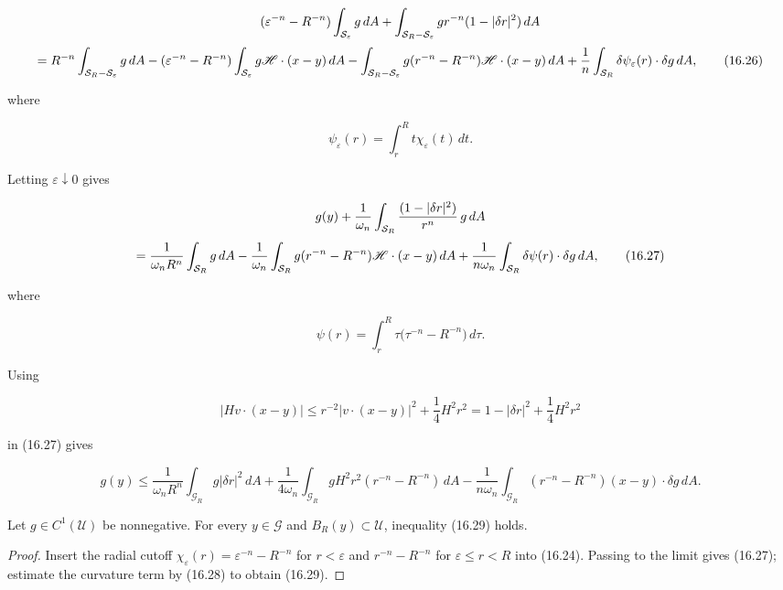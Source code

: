 \[
(\varepsilon^{-n}-R^{-n})\int_{\mathcal{S}_\varepsilon} g\,dA+\int_{\mathcal{S}_R-\mathcal{S}_\varepsilon} gr^{-n}(1-|\delta r|^2)\,dA
\]
\begin{equation}
=R^{-n}\int_{\mathcal{S}_R-\mathcal{S}_\varepsilon} g\,dA-(\varepsilon^{-n}-R^{-n})\int_{\mathcal{S}_\varepsilon} g\mathscr{H}\cdot(x-y)\,dA
\notag\\
-\int_{\mathcal{S}_R-\mathcal{S}_\varepsilon} g(r^{-n}-R^{-n})\mathscr{H}\cdot(x-y)\,dA+\frac{1}{n}\int_{\mathcal{S}_R}\delta\psi_\varepsilon(r)\cdot\delta g\,dA,
\tag{16.26}
\end{equation}

where

\[
\psi_\varepsilon(r)=\int_r^R t\chi_\varepsilon(t)\,dt.
\]

Letting $\varepsilon\downarrow0$ gives

\[
g(y)+\frac{1}{\omega_n}\int_{\mathcal{S}_R}\frac{(1-|\delta r|^2)}{r^n}\,g\,dA
\]
\begin{equation}
=\frac{1}{\omega_n R^n}\int_{\mathcal{S}_R} g\,dA-\frac{1}{\omega_n}\int_{\mathcal{S}_R} g(r^{-n}-R^{-n})\mathscr{H}\cdot(x-y)\,dA
\notag\\
+\frac{1}{n\omega_n}\int_{\mathcal{S}_R}\delta\psi(r)\cdot\delta g\,dA,
\tag{16.27}
\end{equation}

where

\[
\psi(r)=\int_r^R \tau\bigl(\tau^{-n}-R^{-n}\bigr)\,d\tau.
\]

Using

\begin{equation}
|Hv\cdot (x-y)|\le r^{-2}|v\cdot (x-y)|^2+\frac14 H^2r^2
=1-|\delta r|^2+\frac14 H^2r^2
\tag{16.28}
\end{equation}

in (16.27) gives

\begin{equation}
g(y)\le \frac{1}{\omega_n R^n}\int_{\mathcal{G}_R} g|\delta r|^2\,dA
+\frac{1}{4\omega_n}\int_{\mathcal{G}_R} gH^2r^2(r^{-n}-R^{-n})\,dA
-\frac{1}{n\omega_n}\int_{\mathcal{G}_R}(r^{-n}-R^{-n})(x-y)\cdot \delta g\,dA.
\tag{16.29}
\end{equation}

\begin{lemma}\label{gilbarg-trudinger.lem.16.3.potential-estimate}
Let $g\in C^1(\mathcal U)$ be nonnegative. For every $y\in\mathcal G$ and $B_R(y)\subset\mathcal U$, inequality (16.29) holds.
\end{lemma}
\begin{proof}
\sketch Insert the radial cutoff $\chi_\varepsilon(r)=\varepsilon^{-n}-R^{-n}$ for $r<\varepsilon$ and $r^{-n}-R^{-n}$ for $\varepsilon\leq r<R$ into (16.24). Passing to the limit gives (16.27); estimate the curvature term by (16.28) to obtain (16.29).
\end{proof}

